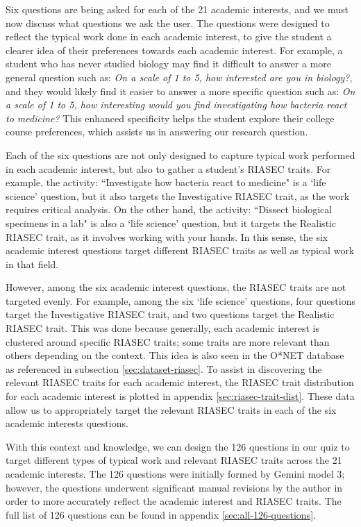 Six questions are being asked for each of the 21 academic interests, and we must now discuss what questions we ask the user.
The questions were designed to reflect the typical work done in each academic interest, to give the student a 
clearer idea of their preferences towards each academic interest.
For example, a student who has never studied biology may find it difficult to answer a more general question such as: 
\emph{On a scale of 1 to 5, how interested are you in biology?},
and they would likely find it easier to answer a more specific question such as:
\emph{On a scale of 1 to 5, how interesting would you find investigating how bacteria react to medicine?}
This enhanced specificity helps the student explore their college course preferences, which assists us in answering our research question.

Each of the six questions are not only designed to capture typical work performed in each academic interest,
but also to gather a student's RIASEC traits.
For example, the activity: ``Investigate how bacteria react to medicine" is a `life science' question,
but it also targets the Investigative RIASEC trait, as the work requires critical analysis.
On the other hand, the activity: ``Dissect biological specimens in a lab" is also a `life science' question,
but it targets the Realistic RIASEC trait, as it involves working with your hands.
In this sense, the six academic interest questions target different RIASEC traits as well as typical work in that field.

However, among the six academic interest questions, the RIASEC traits are not targeted evenly.
For example, among the six `life science' questions, four questions target the Investigative RIASEC trait,
and two questions target the Realistic RIASEC trait.
This was done because generally, each academic interest is clustered around specific RIASEC traits; 
some traits are more relevant than others depending on the context.
This idea is also seen in the O*NET database as referenced in subsection \ref{sec:dataset-riasec}.
To assist in discovering the relevant RIASEC traits for each academic interest, 
the RIASEC trait distribution for each academic interest is plotted in appendix \ref{sec:riasec-trait-dist}.
These data allow us to appropriately target the relevant RIASEC traits 
in each of the six academic interests questions.

With this context and knowledge, we can design the 126 questions in our quiz to target different 
types of typical work and relevant RIASEC traits across the 21 academic interests.
The 126 questions were initially formed by Gemini model 3;
however, the questions underwent significant manual revisions by the author 
in order to more accurately reflect the academic interest and RIASEC traits.
The full list of 126 questions can be found in appendix \ref{sec:all-126-questions}.

